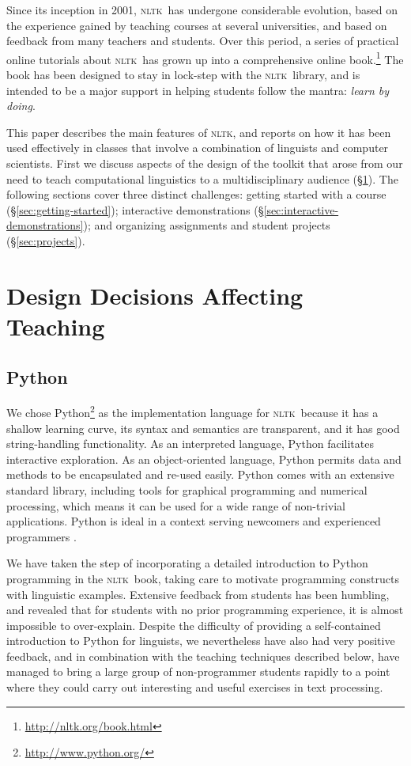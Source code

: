 \documentclass[11pt]{article}
\newcommand{\NLTK}{\textsc{nltk}}
\begin{document}
Since its inception in 2001, \NLTK\ has undergone considerable
evolution, based on the experience gained by teaching courses at
several universities, and based on feedback from many teachers and
students.  Over this period, a series of practical online tutorials
about \NLTK\ has grown up into a comprehensive online book.\footnote{\url{http://nltk.org/book.html}}
The book has been designed to stay in lock-step
with the \NLTK\ library, and is intended to be a major support in
helping students follow the mantra: \textit{learn by doing}.

This paper describes the main features of \NLTK, and reports on how it has
been used effectively in classes that involve a combination of
linguists and computer scientists.  First we discuss aspects of the
design of the toolkit that arose from our need to teach computational
linguistics to a multidisciplinary audience (\S\ref{sec:design}).
The following sections cover three distinct challenges:
getting started with a course (\S\ref{sec:getting-started});
interactive demonstrations (\S\ref{sec:interactive-demonstrations});
and organizing assignments and student projects (\S\ref{sec:projects}).

\section{Design Decisions Affecting Teaching}
\label{sec:design}

\subsection{Python}

We chose Python\footnote{\url{http://www.python.org/}} as the
implementation language for \NLTK\ because it has a shallow learning
curve, its syntax and semantics are transparent, and it has good
string-handling functionality.  As an interpreted language, Python
facilitates interactive exploration.  As an object-oriented language,
Python permits data and methods to be encapsulated and re-used easily.
Python comes with an extensive standard library, including tools for
graphical programming and numerical processing, which means it can be
used for a wide range of non-trivial applications.  Python is ideal in
a context serving newcomers and experienced programmers
\cite{Shannon03}.

We have taken the step of incorporating a detailed introduction to
Python programming in the \NLTK\ book, taking care to motivate
programming constructs with linguistic examples. Extensive feedback
from students has been humbling, and revealed that for students with
no prior programming experience, it is almost impossible to
over-explain. Despite the difficulty of providing a
self-contained introduction to Python for linguists, we nevertheless
have also had very positive feedback, and in combination with the
teaching techniques described below, have managed to bring a
large group of non-programmer students rapidly to a point where they
could carry out interesting and useful exercises in text processing.
\end{document}
